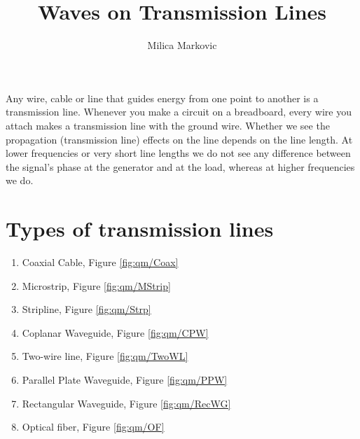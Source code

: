 \documentclass{ximera}
\title{Waves on Transmission Lines}
\author{Milica Markovic}
\begin{document}
  
\begin{abstract}  

\end{abstract}  
\maketitle    






Any wire, cable or line that guides energy from one point to another
is a transmission line. Whenever you make a circuit on a breadboard,
every wire you attach makes  a transmission line with the ground wire. Whether we see the propagation (transmission line) effects on the
line depends on the line length. 
At lower frequencies or very short line lengths we do not
see any difference between the signal's phase at the generator and at the load,
whereas at higher frequencies we do.








\section{Types of transmission lines}

\begin{enumerate}
\item Coaxial Cable, Figure \ref{fig:qm/Coax}
\item Microstrip, Figure \ref{fig:qm/MStrip}
\item Stripline, Figure \ref{fig:qm/Strp}
\item Coplanar Waveguide, Figure \ref{fig:qm/CPW}
\item Two-wire line, Figure \ref{fig:qm/TwoWL}
\item Parallel Plate Waveguide, Figure \ref{fig:qm/PPW}
\item Rectangular Waveguide, Figure \ref{fig:qm/RecWG}
\item Optical fiber, Figure \ref{fig:qm/OF}
\end{enumerate}
\end{document}
